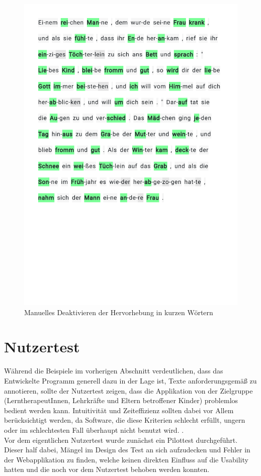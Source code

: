 \begin{figure}[h!]
	\centering
	\includegraphics[width=.7\linewidth, frame]{figures/evaluation/annotation5}
	\caption{Manuelles Deaktivieren der Hervorhebung in kurzen Wörtern}
	\label{fig:evaluation-ex5}
\end{figure}
\newpage

\section{Nutzertest}

Während die Beispiele im vorherigen Abschnitt verdeutlichen, dass das Entwickelte Programm generell dazu in der Lage ist, Texte anforderungsgemäß zu annotieren, sollte der Nutzertest zeigen, dass die Applikation von der Zielgruppe (LerntherapeutInnen, Lehrkräfte und Eltern betroffener Kinder) problemlos bedient werden kann. Intuitivität und Zeiteffizienz sollten dabei vor Allem berücksichtigt werden, da Software, die diese Kriterien schlecht erfüllt, ungern oder im schlechtesten Fall überhaupt nicht benutzt wird. .\\
Vor dem eigentlichen Nutzertest wurde zunächst ein Pilottest durchgeführt. Dieser half dabei, Mängel im Design des Test an sich aufzudecken und Fehler in der Webapplikation zu finden, welche keinen direkten Einfluss auf die Usability hatten und die noch vor dem Nutzertest behoben werden konnten.


